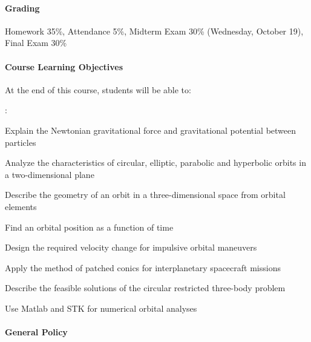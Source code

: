\documentclass[10pt]{article}
\begin{document}
\paragraph*{Grading}
Homework 35\%,\;\; Attendance 5\%,\;\; Midterm Exam 30\% (Wednesday, October 19),\;\; Final Exam 30\%


\paragraph*{Course Learning Objectives}
At the end of this course, students will be able to:

\begin{list}
{:}
{\setlength{\itemsep}{-3pt}}
\item Explain the Newtonian gravitational force and gravitational potential between particles
\item Analyze the characteristics of circular, elliptic, parabolic and hyperbolic orbits in a two-dimensional plane
\item Describe the geometry of an orbit in a three-dimensional space from orbital elements
\item Find an orbital position as a function of time
\item Design the required velocity change for impulsive orbital maneuvers
\item Apply the method of patched conics for interplanetary spacecraft missions
\item Describe the feasible solutions of the circular restricted three-body problem
\item Use Matlab and STK for numerical orbital analyses
\end{list}






\paragraph*{General Policy}
\end{document}
